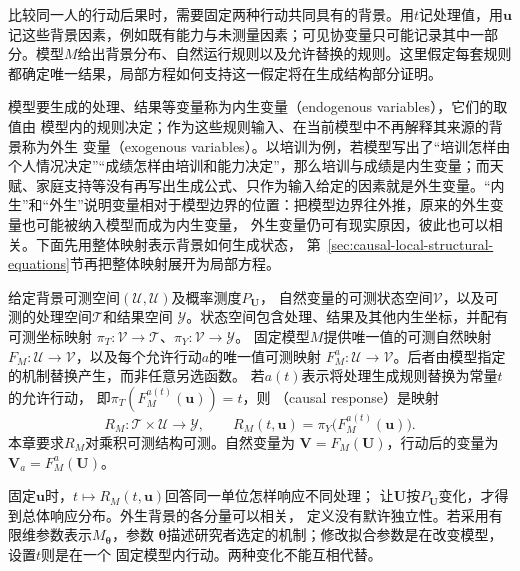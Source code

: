 比较同一人的行动后果时，需要固定两种行动共同具有的背景。用\(t\)记处理值，用\(\bm u\)记这些背景因素，例如既有能力与未测量因素；可见协变量只可能记录其中一部分。模型\(M\)给出背景分布、自然运行规则以及允许替换的规则。这里假定每套规则都确定唯一结果，局部方程如何支持这一假定将在生成结构部分证明。

模型要生成的处理、结果等变量称为内生变量（endogenous variables），它们的取值由
模型内的规则决定；作为这些规则输入、在当前模型中不再解释其来源的背景称为外生
变量（exogenous variables）。以培训为例，若模型写出了“培训怎样由个人情况决定”“成绩怎样由培训和能力决定”，那么培训与成绩是内生变量；而天赋、家庭支持等没有再写出生成公式、只作为输入给定的因素就是外生变量。“内生”和“外生”说明变量相对于模型边界的位置：把模型边界往外推，原来的外生变量也可能被纳入模型而成为内生变量，
外生变量仍可有现实原因，彼此也可以相关。下面先用整体映射表示背景如何生成状态，
第~\ref{sec:causal-local-structural-equations}节再把整体映射展开为局部方程。

\begin{definition}
  \label{def:causal-response-interface}
  给定背景可测空间\((\mathcal U,\mathscr U)\)及概率测度\(P_{\bm U}\)，
  自然变量的可测状态空间\(\mathcal V\)，以及可测的处理空间\(\mathcal T\)和结果空间
  \(\mathcal Y\)。状态空间包含处理、结果及其他内生坐标，并配有可测坐标映射
  \(\pi_T:\mathcal V\to\mathcal T\)、\(\pi_Y:\mathcal V\to\mathcal Y\)。
  固定模型\(M\)提供唯一值的可测自然映射
  \(F_M:\mathcal U\to\mathcal V\)，以及每个允许行动\(a\)的唯一值可测映射
  \(F_M^a:\mathcal U\to\mathcal V\)。后者由模型指定的机制替换产生，而非任意另选函数。
  若\(a(t)\)表示将处理生成规则替换为常量\(t\)的允许行动，
  即\(\pi_T(F_M^{a(t)}(\bm u))=t\)，则
  （causal response）是映射
  \begin{equation}
    R_M:\mathcal T\times\mathcal U\longrightarrow\mathcal Y,
    \qquad
    R_M(t,\bm u)=\pi_Y\bigl(F_M^{a(t)}(\bm u)\bigr).
    \label{eq:causal-response-interface}
  \end{equation}
  本章要求\(R_M\)对乘积可测结构可测。自然变量为
  \(\bm V=F_M(\bm U)\)，行动后的变量为\(\bm V_a=F_M^a(\bm U)\)。
\end{definition}

固定\(\bm u\)时，\(t\mapsto R_M(t,\bm u)\)回答同一单位怎样响应不同处理；
让\(\bm U\)按\(P_{\bm U}\)变化，才得到总体响应分布。外生背景的各分量可以相关，
定义没有默许独立性。若采用有限维参数表示\(M_{\bm\theta}\)，参数
\(\bm\theta\)描述研究者选定的机制；修改拟合参数是在改变模型，设置\(t\)则是在一个
固定模型内行动。两种变化不能互相代替。

